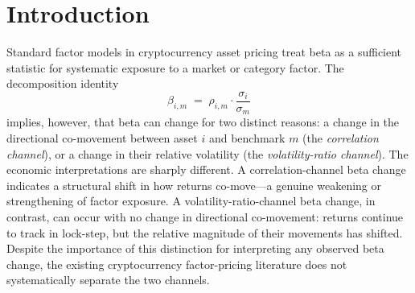 \documentclass[11pt,a4paper]{article}
\begin{document}
\begin{abstract}
Cross-sectional analysis of 16 altcoins (exchange tokens, Layer-1 platforms, DeFi/oracle, and other major altcoins) reveals substantial heterogeneity in beta dynamics across and within categories, with BNB occupying the moderate-to-strong decoupling segment but not an extreme position (BNB rank 6/17 in the cross-sectional pool, $t=-2.22$, $p=0.043$ against the control mean; synthetic-control rank 12/17, $p\approx 0.71$). The cross-sectional evidence supports interpreting BNB's pattern as part of a broader altcoin beta-recompression coinciding with ETH's volatility expansion post-2024, rather than as an asset-specific regime change. We discuss implications for cryptocurrency factor models---specifically, that beta-based models should be augmented with explicit decomposition into correlation and volatility-ratio components when interpreting systematic-exposure changes---and identify on-chain stablecoin flow data and staggered-treatment designs around individual exchange holder-reward launches as priority directions for follow-up causal-mechanism studies. The April 2024 launch of the Binance HODLer Airdrops program serves as a natural \textit{timing benchmark} partitioning our sample but is not the object of any causal claim in this paper.

\vspace{1em}
\noindent\textbf{Keywords:} cryptocurrency, beta decomposition, directional decoupling, volatility-ratio channel, factor models, asymmetric volatility, BNB, exchange-native tokens
\\[0.5em]
\noindent\textbf{JEL Classification:} G12, G14, G15, C58
\end{abstract}

\newpage

\section{Introduction}

Standard factor models in cryptocurrency asset pricing \citep{liu2021,liu2024,sockin2023} treat beta as a sufficient statistic for systematic exposure to a market or category factor. The decomposition identity
\begin{equation}
\beta_{i,m} \;=\; \rho_{i,m} \cdot \frac{\sigma_i}{\sigma_m}
\label{eq:beta_identity}
\end{equation}
implies, however, that beta can change for two distinct reasons: a change in the directional co-movement between asset $i$ and benchmark $m$ (the \emph{correlation channel}), or a change in their relative volatility (the \emph{volatility-ratio channel}). The economic interpretations are sharply different. A correlation-channel beta change indicates a structural shift in how returns co-move---a genuine weakening or strengthening of factor exposure. A volatility-ratio-channel beta change, in contrast, can occur with no change in directional co-movement: returns continue to track in lock-step, but the relative magnitude of their movements has shifted. Despite the importance of this distinction for interpreting any observed beta change, the existing cryptocurrency factor-pricing literature does not systematically separate the two channels.
\end{document}

